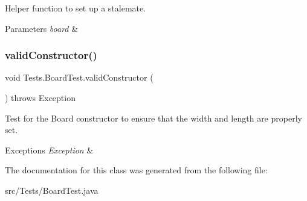Helper function to set up a stalemate. 
\begin{DoxyParams}{Parameters}
{\em board} & \\
\hline
\end{DoxyParams}
\hypertarget{class_tests_1_1_board_test_a7a85d67a559913d4e5a3b0977daa5309}{}\label{class_tests_1_1_board_test_a7a85d67a559913d4e5a3b0977daa5309} 
\subsubsection{\texorpdfstring{valid\+Constructor()}{validConstructor()}}
{\footnotesize\ttfamily void Tests.\+Board\+Test.\+valid\+Constructor (\begin{DoxyParamCaption}{ }\end{DoxyParamCaption}) throws Exception}

Test for the Board constructor to ensure that the width and length are properly set. 
\begin{DoxyExceptions}{Exceptions}
{\em Exception} & \\
\hline
\end{DoxyExceptions}


The documentation for this class was generated from the following file\+:\begin{DoxyCompactItemize}
\item 
src/\+Tests/Board\+Test.\+java\end{DoxyCompactItemize}

